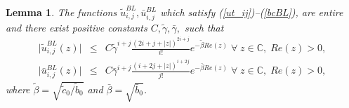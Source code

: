 \documentclass[12pt]{article}
\newtheorem{lemma}[theorem]{Lemma}
\begin{document}
\begin{lemma}
\label{lem:ut_ij}
The functions $\tilde{u}^{BL}_{i,j}, \bar{u}^{BL}_{i,j}$ which satisfy (\ref{ut_ij})--(\ref{bcBL}), are entire and there exist
positive constants $C, \tilde{\gamma}, \bar{\gamma},$ such that
%
\begin{eqnarray*}
\vert \tilde{u}^{BL}_{i,j}(z) \vert &\leq& C \tilde{\gamma}^{i+j} \frac{(2i+j+|z|)^{2i+j}}{i!} e^{-\tilde{\beta} Re(z)} \; \forall \; z \in \mathbb{C}, \; Re(z) > 0,\\
\vert \bar{u}^{BL}_{i,j}(z) \vert &\leq& C \bar{\gamma}^{i+j} \frac{(i+2j+|z|)^{i+2j}}{j!} e^{-\bar{\beta} Re(z)} \; \forall \; z \in \mathbb{C}, \; Re(z) > 0,
\end{eqnarray*}
%
where $\tilde{\beta}=\sqrt{\tilde{c}_{0} / \tilde{b}_{0}}$ and $\bar{\beta}=\sqrt{\bar{b}_{0}}$.
\end{lemma}
%
\end{document}
